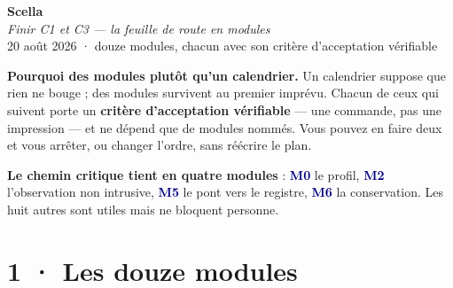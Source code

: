 \documentclass[10pt]{article}
\newcommand{\mm}[1]{\textbf{\textcolor{navy}{#1}}}
\begin{document}
\begin{center}
{\Huge\bfseries\color{navy} Scella}\\[4pt]
{\large\color{grey}\itshape Finir C1 et C3 --- la feuille de route en modules}\\[4pt]
{\small\color{grey} 20 août 2026 \; · \; douze modules, chacun avec son critère d'acceptation vérifiable}
\end{center}
\vspace{2pt}

\begin{these}
\textbf{Pourquoi des modules plutôt qu'un calendrier.} Un calendrier suppose que rien ne bouge ; des
modules survivent au premier imprévu. Chacun de ceux qui suivent porte un \textbf{critère
d'acceptation vérifiable} --- une commande, pas une impression --- et ne dépend que de modules
nommés. Vous pouvez en faire deux et vous arrêter, ou changer l'ordre, sans réécrire le plan.

\textbf{Le chemin critique tient en quatre modules} : \mm{M0} le profil, \mm{M2} l'observation non
intrusive, \mm{M5} le pont vers le registre, \mm{M6} la conservation. Les huit autres sont utiles
mais ne bloquent personne.
\end{these}

\section{1 · Les douze modules}
\end{document}
